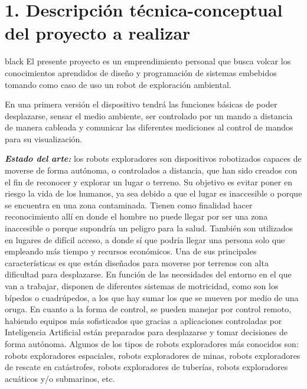 \documentclass[
11pt, %
]{charter}
\begin{document}
\section{1. Descripción técnica-conceptual del proyecto a realizar}
\label{sec:descripcion}

\begin{consigna}{black} %
El presente proyecto es un emprendimiento personal que busca volcar los conocimientos aprendidos de diseño y programación de sistemas embebidos tomando como caso de uso un robot de exploración ambiental. 

En una primera versión el dispositivo tendrá las funciones básicas de poder desplazarse, sensar el medio ambiente, ser controlado por un mando a distancia de manera cableada y comunicar las diferentes mediciones al control de mandos para su visualización.


\textit{\textbf{Estado del arte:}}
los robots exploradores son dispositivos robotizados capaces de moverse de forma autónoma, o controlados a distancia, que han sido creados con el fin de reconocer y explorar un lugar o terreno. Su objetivo es evitar poner en riesgo la vida de los humanos, ya sea debido a que el lugar es inaccesible o porque se encuentra en una zona contaminada.
Tienen como finalidad hacer reconocimiento allí en donde el hombre no puede llegar por ser una zona inaccesible o porque supondría un peligro para la salud. También son utilizados en lugares de difícil acceso, a donde sí que podría llegar una persona solo que empleando más tiempo y recursos económicos.
Una de sus principales características es que están diseñados para moverse por terrenos con alta dificultad para desplazarse. En función de las necesidades del entorno en el que van a trabajar, disponen de diferentes sistemas de motricidad, como son los bípedos o cuadrúpedos, a los que hay sumar los que se mueven por medio de una oruga.
En cuanto a la forma de control, se pueden manejar por control remoto, habiendo equipos más sofisticados que gracias a aplicaciones controladas por Inteligencia Artificial están preparados para desplazarse y tomar decisiones de forma autónoma.
Algunos de los tipos de robots exploradores más conocidos son: robots exploradores espaciales, robots exploradores de minas, robots exploradores de rescate en catástrofes, robots exploradores de tuberías, robots exploradores acuáticos y/o submarinos, etc.


\end{consigna}
\end{document}
